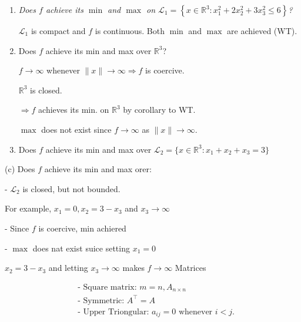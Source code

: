 \documentclass[11pt,a4paper]{article}
\begin{document}
\begin{enumerate}[1)]
    \item \textit{Does $f$ achieve its $\min$ and $\max$ on $\mathcal{L}_{1}=\left\{x \in \mathbb{R}^{3}: x_{1}^{2}+2 x_{2}^{2}+3 x_{3}^{2} \leqslant 6\right\}$?}
    
    $\mathcal{L}_{1}$ is compact and $f$ is continuous. Both $\min$ and $\max$ are achieved (WT).
    \item Does $f$ achieve its min and max over $\mathbb{R}^{3}$?
    
    $f \rightarrow \infty$ whenever $\|x\| \rightarrow \infty \Rightarrow f$ is coercive.

    $\mathbb{R}^{3}$ is closed.

    $\Rightarrow f$ achieves its min. on $\mathbb{R}^{3}$ by corollary to WT.

    $\max$ does not exist since $f \rightarrow \infty$ as $\|x\| \rightarrow \infty$.

    \item Does $f$ achieve its min and max over $\mathcal{L}_{2}=\{x \in \mathbb{R}^{3}: x_{1}+x_{2}+x_{3}=3\}$
\end{enumerate}

(c) Does $f$ achieve its min and max orer:


- $\mathcal{L}_{2}$ is closed, but not bounded.

For example, $x_{1}=0, x_{2}=3-x_{3}$ and $x_{3} \rightarrow \infty$

- Since $f$ is coercive, min achiered

- $\max$ does nat exist suice setting $x_{1}=0$

$x_{2}=3-x_{3}$ and letting $x_{3} \rightarrow \infty$ makes $f \rightarrow \infty$ Matrices


$$
\begin{aligned}
&\text { - Square matrix: } m=n, A_{n \times n} \\
&\text { - Symmetric: } A^{\top}=A \\
&\text { - Upper Triongular: } a_{i j}=0 \text { whenever } i<j \text {. }
\end{aligned}
$$
\end{document}
